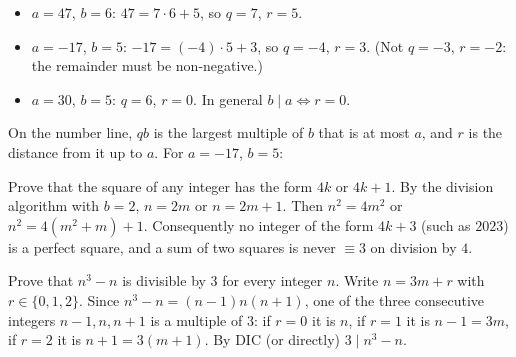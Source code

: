 \begin{example}
\begin{itemize}
  \item $a = 47$, $b = 6$: $47 = 7\cdot 6 + 5$, so $q = 7$, $r = 5$.
  \item $a = -17$, $b = 5$: $-17 = (-4)\cdot 5 + 3$, so $q = -4$, $r = 3$. (Not $q = -3$,
        $r = -2$: the remainder must be non-negative.)
  \item $a = 30$, $b = 5$: $q = 6$, $r = 0$. In general $b \mid a \iff r = 0$.
\end{itemize}
\end{example}

On the number line, $qb$ is the largest multiple of $b$ that is at most $a$, and $r$ is the
distance from it up to $a$. For $a = -17$, $b = 5$:
\begin{center}
\end{center}

\begin{example}
Prove that the square of any integer has the form $4k$ or $4k + 1$.
By the division algorithm with $b = 2$, $n = 2m$ or $n = 2m+1$. Then $n^2 = 4m^2$ or
$n^2 = 4(m^2+m) + 1$. Consequently no integer of the form $4k + 3$ (such as $2023$) is a
perfect square, and a sum of two squares is never $\equiv 3$ on division by $4$.
\end{example}

\begin{example}
Prove that $n^3 - n$ is divisible by $3$ for every integer $n$.
Write $n = 3m + r$ with $r \in \{0,1,2\}$. Since $n^3 - n = (n-1)n(n+1)$, one of the three
consecutive integers $n-1, n, n+1$ is a multiple of $3$: if $r = 0$ it is $n$, if $r = 1$ it is
$n - 1 = 3m$, if $r = 2$ it is $n+1 = 3(m+1)$. By DIC (or directly) $3 \mid n^3 - n$.
\end{example}


